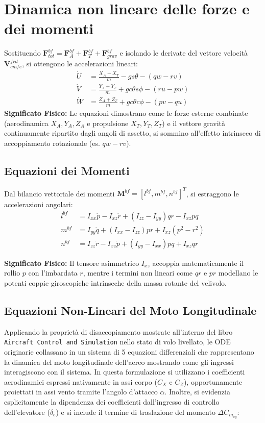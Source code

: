 \section{Dinamica non lineare delle forze e dei momenti}
Sostituendo $\mathbf{F}_{tot}^{bf} = \mathbf{F}_A^{bf} + \mathbf{F}_T^{bf} + \mathbf{F}_{grav}^{bf}$ e isolando le derivate del vettore velocità $\mathbf{V}_{cm/e}^{frd}$, si ottengono le accelerazioni lineari:
\begin{align}
	\dot{U} &= \frac{X_A + X_T}{m} - g s\theta - (qw - rv) \\
	\dot{V} &= \frac{Y_A + Y_T}{m} + g c\theta s\phi - (ru - pw) \\
	\dot{W} &= \frac{Z_A + Z_T}{m} + g c\theta c\phi - (pv - qu)
\end{align}
\textbf{Significato Fisico:} Le equazioni dimostrano come le forze esterne combinate (aerodinamica $X_A, Y_A, Z_A$ e propulsione $X_T, Y_T, Z_T$) e il vettore gravità continuamente ripartito dagli angoli di assetto, si sommino all'effetto intrinseco di accoppiamento rotazionale (es. $qw - rv$).

\subsection*{Equazioni dei Momenti}
Dal bilancio vettoriale dei momenti $\mathbf{M}^{bf} = [l^{bf}, m^{bf}, n^{bf}]^T$, si estraggono le accelerazioni angolari:
\begin{align}
	l^{bf} &= I_{xx}\dot{p} - I_{xz}\dot{r} + (I_{zz} - I_{yy})qr - I_{xz}pq \\
	m^{bf} &= I_{yy}\dot{q} + (I_{xx} - I_{zz})pr + I_{xz}(p^2 - r^2) \\
	n^{bf} &= I_{zz}\dot{r} - I_{xz}\dot{p} + (I_{yy} - I_{xx})pq + I_{xz}qr
\end{align}



\textbf{Significato Fisico:} Il tensore asimmetrico $I_{xz}$ accoppia matematicamente il rollio $p$ con l'imbardata $r$, mentre i termini non lineari come $qr$ e $pr$ modellano le potenti coppie giroscopiche intrinseche della massa rotante del velivolo.
\subsection*{Equazioni Non-Lineari del Moto Longitudinale}
\label{sec:coeff_aero}
Applicando la proprietà di disaccopiamento mostrate all'interno del libro \texttt{Aircraft Control and Simulation} nello stato di volo livellato, le ODE originarie collassano in un sistema di 5 equazioni differenziali che rappresentano la dinamica del moto longitudinale dell'aereo mostrando come gli ingressi interagiscono con il sistema. In questa formulazione si utilizzano i coefficienti aerodinamici espressi nativamente in assi corpo ($C_X$ e $C_Z$), opportunamente proiettati in assi vento tramite l'angolo d'attacco $\alpha$. Inoltre, si evidenzia esplicitamente la dipendenza dei coefficienti dall'ingresso di controllo dell'elevatore ($\delta_e$) e si include il termine di traslazione del momento $\Delta C_{m_{cg}}$:

